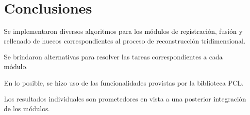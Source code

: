 \chapter{Conclusiones}
Se implementaron diversos algoritmos para los módulos de registración, fusión y
rellenado de huecos correspondientes al proceso de reconstrucción
tridimensional.

Se brindaron alternativas para resolver las tareas correspondientes a cada módulo.

En lo posible, se hizo uso de las funcionalidades provistas por la biblioteca PCL.

Los resultados individuales son prometedores en vista a una posterior integración de los módulos.
